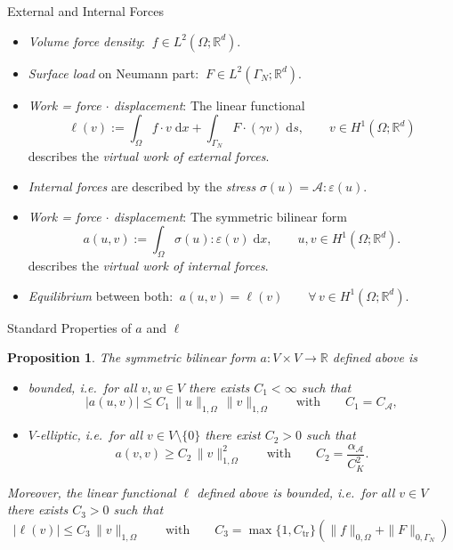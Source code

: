 \documentclass[10pt,aspectratio=169]{beamer}
\newtheorem{proposition}{Proposition}[section]
\def\R{{\mathbb R}}
\def\cA{{\mathcal A}}
\def\d{{\mathrm{d}}}
\def\dx{{\d x}}
\def\ds{{\d s}}
\begin{document}
\begin{frame}{External and Internal Forces}
	\begin{itemize}
		\item {\em Volume force density}: $\ f\in L^2(\Omega;\R^d)$.
		\item {\em Surface load} on Neumann part: $\ F\in L^2(\Gamma_N;\R^d)$.
		\item {\em Work = force $\cdot$ displacement}: The linear functional
		      \begin{equation*}
			      \ell(v)
			      :=
			      \int_\Omega f\cdot v\;\dx
			      +
			      \int_{\Gamma_N} F\cdot (\gamma v)\;\ds,\qquad v\in H^1(\Omega;\R^d)
		      \end{equation*}
		      describes the {\em virtual work of external forces}.
		\item {\em Internal forces} are described by the {\em stress} $\sigma(u) = \cA:\varepsilon(u)$.
		\item {\em Work = force $\cdot$ displacement}: The symmetric bilinear form
		      \begin{equation*}
			      a(u,v)
			      :=
			      \int_\Omega \sigma(u):\varepsilon(v)\;\dx,\qquad u,v\in H^1(\Omega;\R^d).
		      \end{equation*}
		      describes the {\em virtual work of internal forces}.
		\item {\em Equilibrium} between both: $\ a(u,v) = \ell(v)\qquad\forall\,v\in H^1(\Omega;\R^d)$.
	\end{itemize}
\end{frame}

\begin{frame}{Standard Properties of $a$ and $\ell$}
	\begin{proposition}
		The symmetric bilinear form $a:V\times V\to \R$ defined above is
		\begin{itemize}
			\item[i)] {\em bounded}, i.e.\ for all $v,w\in V$ there exists $C_1<\infty$ such that
			      \begin{equation*}
				      |a(u,v)|\le C_1\,\|u\|_{1,\Omega}\,\|v\|_{1,\Omega}\qquad \text{with}\qquad C_1 = C_\cA,
			      \end{equation*}
			\item[ii)] $V${\em -elliptic}, i.e.\ for all $v\in V\setminus\{0\}$ there exist $C_2>0$ such that
			      \begin{equation*}
				      a(v,v)\ge C_2\,\|v\|_{1,\Omega}^2\qquad\text{with}\qquad C_2 = \frac{\alpha_\cA}{C_K^2}.
			      \end{equation*}
		\end{itemize}
		Moreover, the linear functional $\ell$ defined above is {\em bounded}, i.e.\ for all $v\in V$ there exists $C_3>0$ such that
		\begin{equation*}
			|\ell (v)|\le C_3\,\|v\|_{1,\Omega}\qquad\text{with}\qquad C_3 = \max\{1,C_\mathrm{tr}\}\left(\|f\|_{0,\Omega}+\|F\|_{0,\Gamma_N}\right)
		\end{equation*}
	\end{proposition}
\end{frame}
\end{document}
